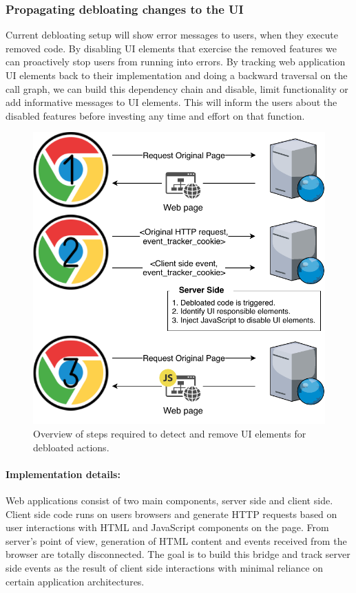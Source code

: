 \subsubsection{Propagating debloating changes to the UI}
Current debloating setup will show error messages to users, when they execute removed code. By disabling UI elements that exercise the removed features we can proactively stop users from running into errors. By tracking web application UI elements back to their implementation and doing a backward traversal on the call graph, we can build this dependency chain and disable, limit functionality or add informative messages to UI elements. This will inform the users about the disabled features before investing any time and effort on that function.

\begin{figure}[t]
  \centering
  \includegraphics[width=0.7\linewidth]{figures/UI-backend-debloating.pdf}
  \caption{Overview of steps required to detect and remove UI elements for debloated actions.}
  \label{fig:uidebloating}
\end{figure}

\paragraph{Implementation details:} Web applications consist of two main components, server side and client side. Client side code runs on users browsers and generate HTTP requests based on user interactions with HTML and JavaScript components on the page. From server's point of view, generation of HTML content and events received from the browser are totally disconnected. The goal is to build this bridge and track server side events as the result of client side interactions with minimal reliance on certain application architectures.

